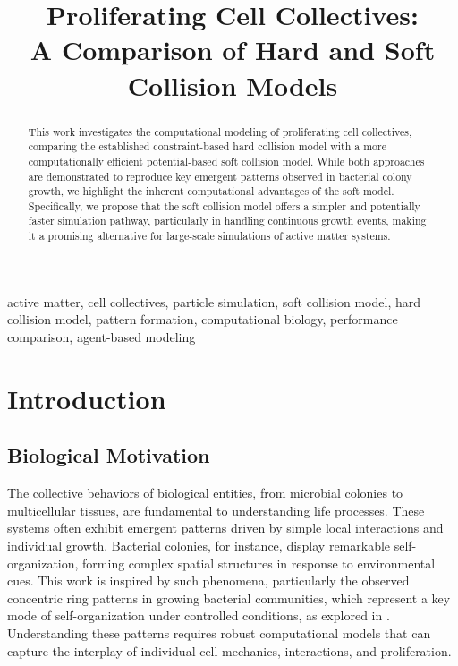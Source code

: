 \documentclass[conference]{IEEEtran}
\begin{document}
\title{Proliferating Cell Collectives: \\A Comparison of Hard and Soft Collision Models}

\author{
}

\maketitle

\begin{abstract}
    This work investigates the computational modeling of proliferating cell collectives, comparing the established constraint-based hard collision model\cite{Weady2024} with a more computationally efficient potential-based soft collision model. While both approaches are demonstrated to reproduce key emergent patterns observed in bacterial colony growth, we highlight the inherent computational advantages of the soft model. Specifically, we propose that the soft collision model offers a simpler and potentially faster simulation pathway, particularly in handling continuous growth events, making it a promising alternative for large-scale simulations of active matter systems.

\end{abstract}

\begin{IEEEkeywords}
    active matter, cell collectives, particle simulation, soft collision model, hard collision model, pattern formation, computational biology, performance comparison, agent-based modeling
\end{IEEEkeywords}


\section{Introduction}
\subsection{Biological Motivation}

The collective behaviors of biological entities, from microbial colonies to multicellular tissues, are fundamental to understanding life processes. These systems often exhibit emergent patterns driven by simple local interactions and individual growth. Bacterial colonies, for instance, display remarkable self-organization, forming complex spatial structures in response to environmental cues. This work is inspired by such phenomena, particularly the observed concentric ring patterns in growing bacterial communities, which represent a key mode of self-organization under controlled conditions, as explored in \cite{Weady2024}. Understanding these patterns requires robust computational models that can capture the interplay of individual cell mechanics, interactions, and proliferation.
\end{document}
